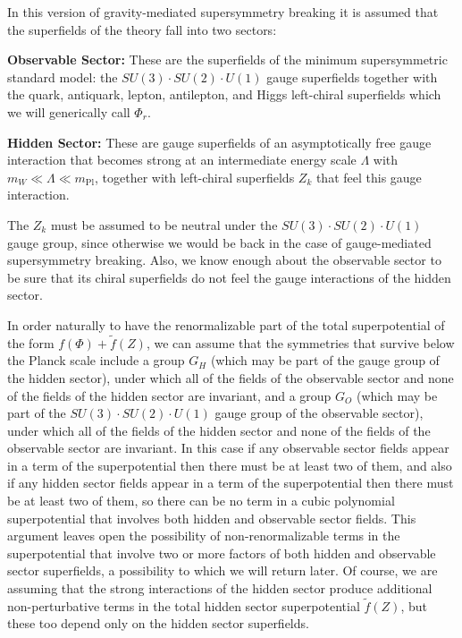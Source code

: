 In this version of gravity-mediated supersymmetry breaking it is assumed
that the superfields of the theory fall into two sectors:

\noindent\textbf{Observable Sector:} These are the superfields of the
minimum supersymmetric standard model: the
\(SU(3)\cdot SU(2)\cdot U(1)\) gauge superfields together with the quark,
antiquark, lepton, antilepton, and Higgs left-chiral superfields which we
will generically call \(\Phi_r\).

\noindent\textbf{Hidden Sector:} These are gauge superfields of an
asymptotically free gauge interaction that becomes strong at an intermediate
energy scale \(\Lambda\) with
\(m_W\ll\Lambda\ll m_{\mathrm{Pl}}\), together with left-chiral superfields
\(Z_k\) that feel this gauge interaction.

The \(Z_k\) must be assumed to be neutral under the
\(SU(3)\cdot SU(2)\cdot U(1)\) gauge group, since otherwise we would be back
in the case of gauge-mediated supersymmetry breaking. Also, we know enough
about the observable sector to be sure that its chiral superfields do not
feel the gauge interactions of the hidden sector.

In order naturally to have the renormalizable part of the total
superpotential of the form \(f(\Phi)+\widetilde f(Z)\), we can assume that
the symmetries that survive below the Planck scale include a group \(G_H\)
(which may be part of the gauge group of the hidden sector), under which all
of the fields of the observable sector and none of the fields of the hidden
sector are invariant, and a group \(G_O\) (which may be part of the
\(SU(3)\cdot SU(2)\cdot U(1)\) gauge group of the observable sector), under
which all of the fields of the hidden sector and none of the fields of the
observable sector are invariant. In this case if any observable sector
fields appear in a term of the superpotential then there must be at least
two of them, and also if any hidden sector fields appear in a term of the
superpotential then there must be at least two of them, so there can be no
term in a cubic polynomial superpotential that involves both hidden and
observable sector fields. This argument leaves open the possibility of
non-renormalizable terms in the superpotential that involve two or more
factors of both hidden and observable sector superfields, a possibility to
which we will return later. Of course, we are assuming that the strong
interactions of the hidden sector produce additional non-perturbative terms
in the total hidden sector superpotential \(\widetilde f(Z)\), but these too
depend only on the hidden sector superfields.

